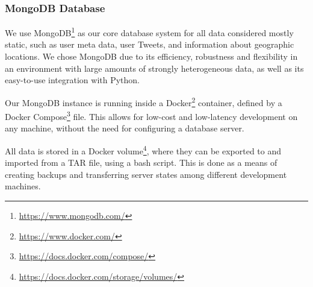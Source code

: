\documentclass[10pt,a4paper]{article}
\begin{document}
\subsubsection{MongoDB Database}
We use MongoDB\footnote{\href{https://www.mongodb.com/}{https://www.mongodb.com/}} as our core database system for all data considered mostly static, such as user meta data, user Tweets, and information about geographic locations. We chose MongoDB due to its efficiency, robustness and flexibility in an environment with large amounts of strongly heterogeneous data, as well as its easy-to-use integration with Python. 

Our MongoDB instance is running inside a Docker\footnote{\href{https://www.docker.com/}{https://www.docker.com/}} container, defined by a Docker Compose\footnote{\href{https://docs.docker.com/compose/}{https://docs.docker.com/compose/}} file. This allows for low-cost and low-latency development on any machine, without the need for configuring a database server.

All data is stored in a Docker volume\footnote{\href{https://docs.docker.com/storage/volumes/}{https://docs.docker.com/storage/volumes/}}, where they can be exported to and imported from a TAR file, using a bash script. This is done as a means of creating backups and transferring server states among different development machines.
\end{document}
